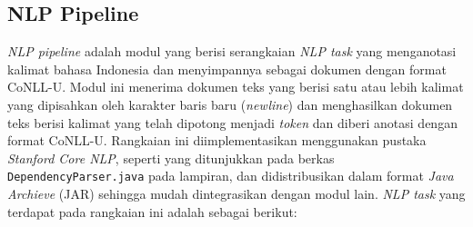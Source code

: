 \subsection{NLP Pipeline}

\textit{NLP pipeline} adalah modul yang berisi serangkaian \textit{NLP task} yang menganotasi kalimat bahasa Indonesia dan menyimpannya sebagai dokumen dengan format CoNLL-U. Modul ini menerima dokumen teks yang berisi satu atau lebih kalimat yang dipisahkan oleh karakter baris baru (\textit{newline}) dan menghasilkan dokumen teks berisi kalimat yang telah dipotong menjadi \textit{token} dan diberi anotasi dengan format CoNLL-U. Rangkaian ini diimplementasikan menggunakan pustaka \textit{Stanford Core NLP}, seperti yang ditunjukkan pada berkas \verb|DependencyParser.java| pada lampiran, dan didistribusikan dalam format \textit{Java Archieve} (JAR) sehingga mudah dintegrasikan dengan modul lain. \textit{NLP task} yang terdapat pada rangkaian ini adalah sebagai berikut:

